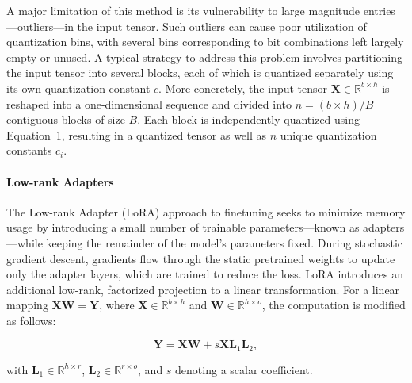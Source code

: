 A major limitation of this method is its vulnerability to large magnitude entries—outliers—in the input tensor. Such outliers can cause poor utilization of quantization bins, with several bins corresponding to bit combinations left largely empty or unused. A typical strategy to address this problem involves partitioning the input tensor into several blocks, each of which is quantized separately using its own quantization constant $c$. More concretely, the input tensor $\mathbf{X}\in \mathbb{R}^{b\times h}$ is reshaped into a one-dimensional sequence and divided into $n = ({b\times h})/{B}$ contiguous blocks of size $B$. Each block is independently quantized using Equation~1, resulting in a quantized tensor as well as $n$ unique quantization constants $c_i$.

\paragraph{Low-rank Adapters} The Low-rank Adapter (LoRA) approach to finetuning \citep{hu2021lora} seeks to minimize memory usage by introducing a small number of trainable parameters—known as adapters—while keeping the remainder of the model’s parameters fixed. During stochastic gradient descent, gradients flow through the static pretrained weights to update only the adapter layers, which are trained to reduce the loss. LoRA introduces an additional low-rank, factorized projection to a linear transformation. For a linear mapping ${\mathbf{X}\mathbf{W} = \mathbf{Y}}$, where $\mathbf{X}\in \mathbb{R}^{b\times h}$ and $\mathbf{W}\in \mathbb{R}^{h\times o}$, the computation is modified as follows:

\begin{equation}
    \mathbf{Y} = \mathbf{X}\mathbf{W} + s\mathbf{X}\mathbf{L}_1\mathbf{L}_2,
\end{equation}

with $\mathbf{L}_1\in  \mathbb{R}^{h\times r}$, $\mathbf{L}_2\in  \mathbb{R}^{r\times o}$, and $s$ denoting a scalar coefficient.

